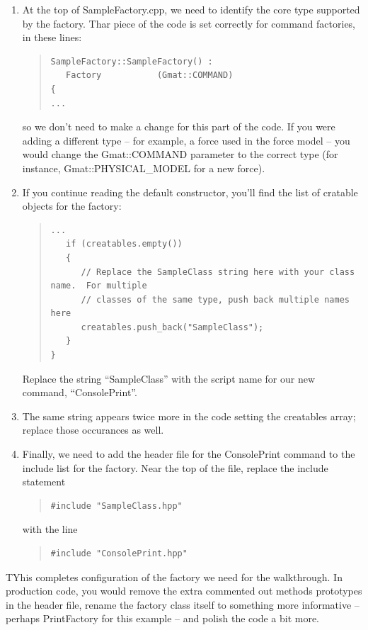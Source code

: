 \documentclass[10pt,letterpaper]{article}
\begin{document}
\begin{enumerate}
\setcounter{enumi}{\value{saveenum}}
\item At the top of SampleFactory.cpp, we need to identify the core type supported by the factory.  Thar piece of the code is set correctly for command factories, in these lines:
\begin{quote}
\begin{verbatim}
SampleFactory::SampleFactory() :
   Factory           (Gmat::COMMAND)
{
...
\end{verbatim}
\end{quote}
so we don't need to make a change for this part of the code.  If you were adding a different type -- for example, a force used in the force model -- you would change the Gmat::COMMAND parameter to the correct type (for instance, Gmat::PHYSICAL{\_}MODEL for a new force).
\item If you continue reading the default constructor, you'll find the list of cratable objects for the factory: 
\begin{quote}
\begin{verbatim}
...
   if (creatables.empty())
   {
      // Replace the SampleClass string here with your class name.  For multiple 
      // classes of the same type, push back multiple names here
      creatables.push_back("SampleClass");
   }
}
\end{verbatim}
\end{quote}
Replace the string ``SampleClass'' with the script name for our new command, ``ConsolePrint''.
\item The same string appears twice more in the code setting the creatables array; replace those occurances as well.
\item Finally, we need to add the header file for the ConsolePrint command to the include list for the factory.  Near the top of the file, replace the include statement
\begin{quote}
\begin{verbatim}
#include "SampleClass.hpp"
\end{verbatim}
\end{quote}
with the line
\begin{quote}
\begin{verbatim}
#include "ConsolePrint.hpp"
\end{verbatim}
\end{quote}
\setcounter{saveenum}{\value{enumi}}
\end{enumerate}

TYhis completes configuration of the factory we need for the walkthrough.  In production code, you would remove the extra commented out methods prototypes in the header file, rename the factory class itself to something more informative -- perhaps PrintFactory for this example -- and polish the code a bit more.  
\end{document}
